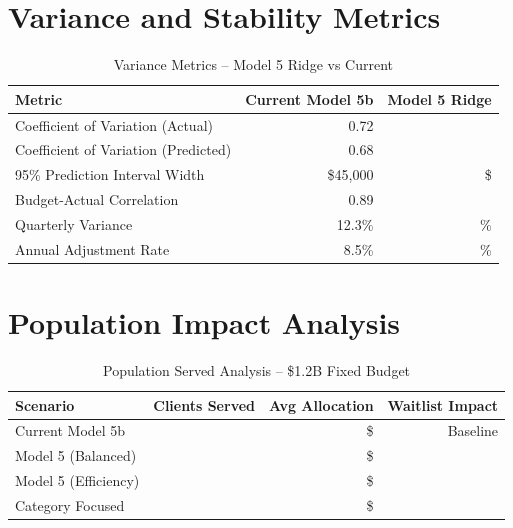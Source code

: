 \section{Variance and Stability Metrics}

\begin{table}[h]
\centering
\caption{Variance Metrics -- Model 5 Ridge vs Current}
\begin{tabular}{lrr}
\toprule
\textbf{Metric} & \textbf{Current Model 5b} & \textbf{Model 5 Ridge} \\
\midrule
Coefficient of Variation (Actual) & 0.72 & \ModelFiveCVActual{} \\
Coefficient of Variation (Predicted) & 0.68 & \ModelFiveCVPredicted{} \\
95\% Prediction Interval Width & \$45,000 & \$\ModelFivePredictionInterval{} \\
Budget-Actual Correlation & 0.89 & \ModelFiveBudgetActualCorr{} \\
Quarterly Variance & 12.3\% & \ModelFiveQuarterlyVariance{}\% \\
Annual Adjustment Rate & 8.5\% & \ModelFiveAnnualAdjustmentRate{}\% \\
\bottomrule
\end{tabular}
\end{table}

\section{Population Impact Analysis}

\begin{table}[h]
\centering
\caption{Population Served Analysis -- \$1.2B Fixed Budget}
\begin{tabular}{lrrr}
\toprule
\textbf{Scenario} & \textbf{Clients Served} & \textbf{Avg Allocation} & \textbf{Waitlist Impact} \\
\midrule
Current Model 5b & \ModelFivePopcurrentbaselineClients{} & \$\ModelFivePopcurrentbaselineAvgAlloc{} & Baseline \\
Model 5 (Balanced) & \ModelFivePopmodelbalancedClients{} & \$\ModelFivePopmodelbalancedAvgAlloc{} & \ModelFivePopmodelbalancedWaitlistChange{} \\
Model 5 (Efficiency) & \ModelFivePopmodelefficiencyClients{} & \$\ModelFivePopmodelefficiencyAvgAlloc{} & \ModelFivePopmodelefficiencyWaitlistChange{} \\
Category Focused & \ModelFivePopcategoryfocusedClients{} & \$\ModelFivePopcategoryfocusedAvgAlloc{} & \ModelFivePopcategoryfocusedWaitlistChange{} \\
\bottomrule
\end{tabular}
\end{table}


